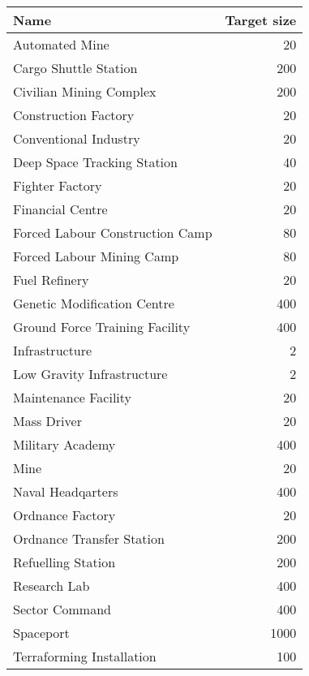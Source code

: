 \documentclass[../../Aurora C# unofficial manual.tex]{subfiles}
\begin{document}
	\begin{center}
		\begin{tabular}{|l|r|}
			\hline
			\textbf{Name} & \textbf{Target size} \\
			\hline
			Automated Mine & 20 \\
			\hline
			Cargo Shuttle Station & 200 \\
			\hline
			Civilian Mining Complex & 200 \\
			\hline
			Construction Factory & 20 \\
			\hline
			Conventional Industry & 20 \\
			\hline
			Deep Space Tracking Station & 40 \\
			\hline
			Fighter Factory & 20 \\
			\hline
			Financial Centre & 20 \\
			\hline
			Forced Labour Construction Camp & 80 \\
			\hline
			Forced Labour Mining Camp & 80 \\
			\hline
			Fuel Refinery & 20 \\
			\hline
			Genetic Modification Centre & 400 \\
			\hline
			Ground Force Training Facility & 400 \\
			\hline
			Infrastructure & 2 \\
			\hline
			Low Gravity Infrastructure & 2 \\
			\hline
			Maintenance Facility & 20 \\
			\hline
			Mass Driver & 20 \\
			\hline
			Military Academy & 400 \\
			\hline
			Mine & 20 \\
			\hline
			Naval Headqarters & 400 \\
			\hline
			Ordnance Factory & 20 \\
			\hline
			Ordnance Transfer Station & 200 \\
			\hline
			Refuelling Station & 200 \\
			\hline
			Research Lab & 400 \\
			\hline
			Sector Command & 400 \\
			\hline
			Spaceport & 1000 \\
			\hline
			Terraforming Installation & 100 \\
			\hline
		\end{tabular}
	\end{center}
\end{document}
